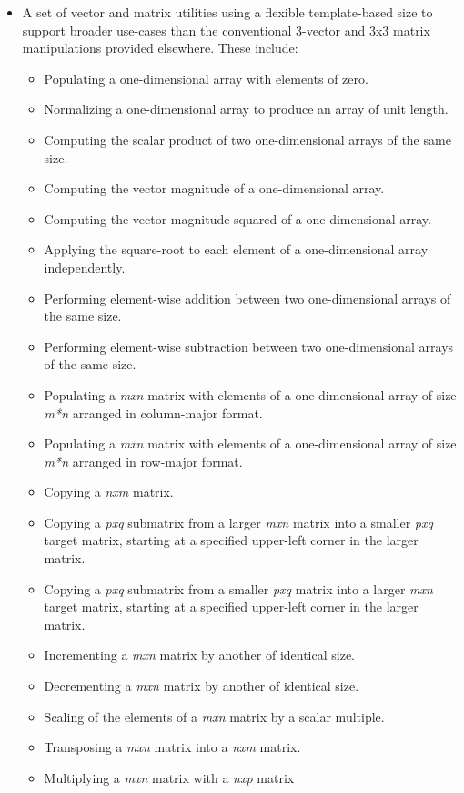 \documentclass[11pt,fleqn]{report}
\begin{document}
\begin{itemize}
\item A set of vector and matrix utilities using a flexible template-based
size to support broader use-cases than the conventional 3-vector and
3x3 matrix manipulations provided elsewhere. These include:
\begin{itemize}
\item Populating a one-dimensional array with elements of zero.
\item Normalizing a one-dimensional array to produce an array of unit length.
\item Computing the scalar product of two one-dimensional arrays
of the same size.
\item Computing the vector magnitude of a one-dimensional array.
\item Computing the vector magnitude squared of a one-dimensional array.
\item Applying the square-root to each element of a one-dimensional array independently.
\item Performing element-wise addition between two one-dimensional arrays
of the same size.
\item Performing element-wise subtraction between two one-dimensional arrays
of the same size.
\item Populating a \textit{mxn} matrix with elements of a one-dimensional
array of size \textit{m*n} arranged in column-major format.
\item Populating a \textit{mxn} matrix with elements of a one-dimensional
array of size \textit{m*n} arranged in row-major format.
\item Copying a \textit{nxm} matrix.
\item Copying a \textit{pxq} submatrix from a larger \textit{mxn} matrix into
a smaller \textit{pxq} target matrix, starting at a specified upper-left
corner in the larger matrix.
\item Copying a \textit{pxq} submatrix from a smaller \textit{pxq} matrix into
a larger \textit{mxn} target matrix, starting at a specified upper-left
corner in the larger matrix.
\item Incrementing a \textit{mxn} matrix by another of identical
size.
\item Decrementing a \textit{mxn} matrix by another of identical
size.
\item Scaling of the elements of a \textit{mxn} matrix by a scalar
multiple.
\item Transposing a \textit{mxn} matrix into a \textit{nxm}
matrix.
\item Multiplying a \textit{mxn} matrix with a \textit{nxp} matrix

\end{itemize}
\end{itemize}
\end{document}
